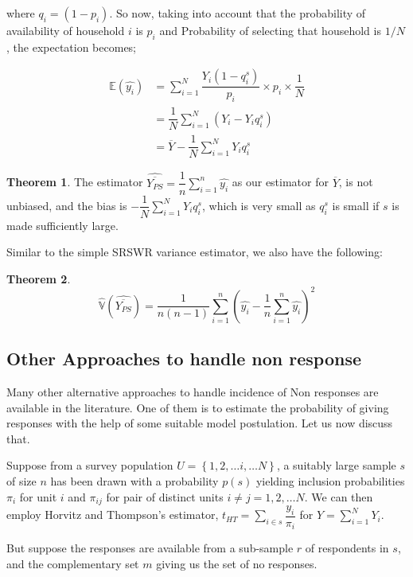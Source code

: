 \documentclass[12pt]{article}
\newcommand{\E}{\mathbb{E}}
\newcommand{\Var}{\mathbb{V}}
\theoremstyle{definition}
\newtheorem{thm}{Theorem}
\newenvironment{theorem}{
\begin{tcolorbox}[colback=green!5!white,colframe=green!75!black, parbox = false]\begin{thm} }{\end{thm}\end{tcolorbox} }
\begin{document}
where $q_i = (1 - p_i)$. So now, taking into account that the probability of availability of household $i$ is $p_i$ and Probability of selecting that household is $1/N$, the expectation becomes;

\begin{align*}
    \E(\widehat{y_i})
    & = \sum_{i = 1}^{N} \dfrac{Y_i (1 - q_i^s)}{p_i} \times p_i \times \dfrac{1}{N}\\
    & = \dfrac{1}{N} \sum_{i = 1}^{N} \left( Y_i - Y_i q_i^s \right)\\
    & = \overline{Y} - \dfrac{1}{N} \sum_{i=1}^{N} Y_i q_i^s
\end{align*}

\begin{theorem}
    The estimator $\widehat{\overline{Y_{PS}}} = \dfrac{1}{n}\sum_{i=1}^{n} \widehat{y_i}$ as our estimator for $\overline{Y}$, is not unbiased, and the bias is $- \dfrac{1}{N} \sum_{i=1}^{N} Y_i q_i^s$, which is very small as $q_i^s$ is small if $s$ is made sufficiently large.
\end{theorem}

Similar to the simple SRSWR variance estimator, we also have the following:

\begin{theorem}
    $$\widehat{\Var}\left( \widehat{\overline{Y_{PS}}} \right) = \dfrac{1}{n(n-1)} \sum_{i=1}^{n} \left( \widehat{y_i} - \dfrac{1}{n}\sum_{i=1}^{n}\widehat{y_i} \right)^2$$
\end{theorem}


\subsection{Other Approaches to handle non response}

Many other alternative approaches to handle incidence of Non responses are available in the literature. One of them is to estimate the probability of giving responses with the help of some suitable model postulation. Let us now discuss that.

Suppose from a survey population $U = \left\{1, 2, \dots i, \dots N \right\}$, a suitably large sample $s$ of size $n$ has been drawn with a probability $p(s)$ yielding inclusion probabilities $\pi_i$ for unit $i$ and $\pi_{ij}$ for pair of distinct units $i\neq j  = 1, 2, \dots N$. We can then employ Horvitz and Thompson's estimator, $t_{HT} = \sum_{i \in s} \dfrac{y_i}{\pi_i}$ for $Y = \sum_{i = 1}^{N} Y_i$.

But suppose the responses are available from a sub-sample $r$ of respondents in $s$, and the complementary set $m$ giving us the set of no responses.
\end{document}
